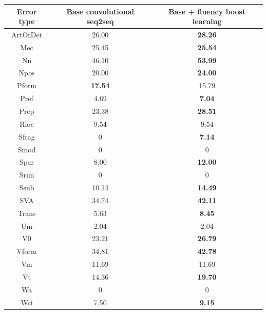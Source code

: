 \documentclass{article} %
\begin{document}
\begin{table}[t]
\centering
\small
\begin{tabular}{c|c|c}
\hline
\bf Error type & \bf Base convolutional seq2seq & \bf Base + fluency boost learning \\ \hline
ArtOrDet   & 26.00                      & \bf 28.26              \\
Mec        & 25.45                      & \bf 25.54              \\
Nn         & 46.10                      & \bf 53.99              \\
Npos       & 20.00                      & \bf 24.00              \\
Pform      & \bf 17.54                      & 15.79              \\
Pref       & 4.69                       & \bf 7.04               \\
Prep       & 23.38                      & \bf  28.51              \\
Rloc       & 9.54                       & 9.54               \\
Sfrag      & 0                          & \bf 7.14               \\
Smod       & 0                          & 0                  \\
Spar       & 8.00                       & \bf 12.00              \\
Srun       & 0                          & 0                  \\
Ssub       & 10.14                      & \bf 14.49              \\
SVA        & 34.74                      & \bf 42.11              \\
Trans      & 5.63                       & \bf 8.45               \\
Um         & 2.04                       & 2.04               \\
V0         & 23.21                      & \bf 26.79              \\
Vform      & 34.81                      & \bf 42.78              \\
Vm         & 11.69                      & 11.69              \\
Vt         & 14.36                      & \bf 19.70              \\
Wa         & 0                          & 0                  \\
Wci        & 7.50                       & \bf 9.15               \\

\end{tabular}
\end{table}
\end{document}
